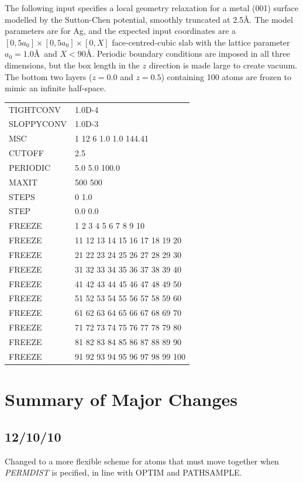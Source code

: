 \documentclass[12pt,a4paper,dvips]{article}
\begin{document}
\noindent The following input specifies a local geometry relaxation for a metal (001) surface modelled by the Sutton-Chen potential, smoothly truncated at 2.5\AA. The model parameters are for Ag, and the expected input coordinates are a $[0,5a_{0}] \times [0,5a_{0}] \times [0,X]$ face-centred-cubic slab with the lattice parameter $a_{0} = 1.0$\AA~and $X < 90$\AA. Periodic boundary conditions are imposed in all three dimensions, but the box length in the $z$ direction is made large to create vacuum. The bottom two layers ($z = 0.0$ and $z=0.5$) containing 100 atoms are frozen to mimic an infinite half-space.

\medskip
\begin{tabular}{ll}
TIGHTCONV  & 1.0D-4 \\
SLOPPYCONV & 1.0D-3 \\
MSC & 1 12 6 1.0 1.0 144.41 \\
CUTOFF & 2.5 \\
PERIODIC & 5.0 5.0 100.0 \\
MAXIT & 500 500 \\
STEPS & 0 1.0 \\
STEP & 0.0 0.0 \\
FREEZE & 1 2 3 4 5 6 7 8 9 10 \\
FREEZE & 11 12 13 14 15 16 17 18 19 20 \\
FREEZE & 21 22 23 24 25 26 27 28 29 30 \\
FREEZE & 31 32 33 34 35 36 37 38 39 40 \\
FREEZE & 41 42 43 44 45 46 47 48 49 50 \\
FREEZE & 51 52 53 54 55 56 57 58 59 60 \\
FREEZE & 61 62 63 64 65 66 67 68 69 70 \\
FREEZE & 71 72 73 74 75 76 77 78 79 80 \\
FREEZE & 81 82 83 84 85 86 87 88 89 90 \\
FREEZE & 91 92 93 94 95 96 97 98 99 100 \\
\end{tabular}
\medskip

\section{Summary of Major Changes}

\subsection{12/10/10}
Changed to a more flexible scheme for atoms that must move together when
{\it PERMDIST\/} is pecified, in line with OPTIM and PATHSAMPLE.
\end{document}
